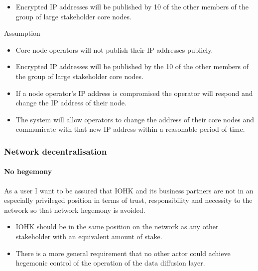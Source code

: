 \documentclass{report}
\theoremstyle{definition}{
  \newtheorem{lemma}{Lemma}[section] %
  \newtheorem{definition}[lemma]{Definition}
}
\theoremstyle{theorem}{
  \newtheorem{invariant}[lemma]{Invariant}
  \newtheorem{proofobligation}[lemma]{Proof Obligation}
}
\numberwithin{equation}{lemma}
\begin{document}
\begin{itemize}
\item Encrypted IP addresses will be published by 10 of the other members of
      the group of large stakeholder core nodes.
\end{itemize}

Assumption

\begin{itemize}
\item Core node operators will not publish their IP addresses publicly.
\item Encrypted IP addresses will be published by the 10 of the other members
      of the group of large stakeholder core nodes.
\item If a node operator's IP address is compromised the operator will respond
      and change the IP address of their node.
\item The system will allow operators to change the address of their core nodes
      and communicate with that new IP address within a reasonable period of
      time.
\end{itemize}


\subsubsection{Network decentralisation}

\paragraph{No hegemony}

As a user I want to be assured that IOHK and its business partners are not in
an especially privileged position in terms of trust, responsibility and
necessity to the network so that network hegemony is avoided.

\begin{itemize}
\item IOHK should be in the same position on the network as any other
      stakeholder with an equivalent amount of stake.
\item There is a more general requirement that no other actor could
      achieve hegemonic control of the operation of the data diffusion layer.
\end{itemize}
\end{document}
